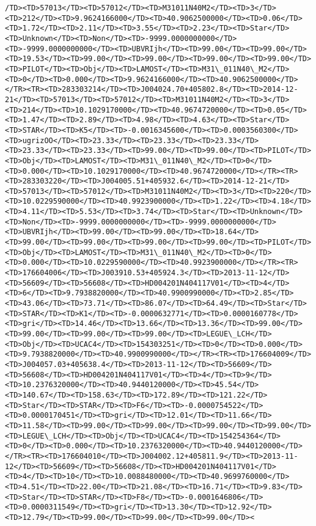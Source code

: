 \documentclass[11pt]{article}
\begin{document}
\begin{Verbatim}[commandchars=\\\{\}]
/TD><TD>57013</TD><TD>57012</TD><TD>M31011N40M2</TD><TD>3</TD><TD>212</TD><TD>9.9624166000</TD><TD>40.9062500000</TD><TD>0.06</TD><TD>1.72</TD><TD>2.11</TD><TD>3.55</TD><TD>2.23</TD><TD>Star</TD><TD>Unknown</TD><TD>Non</TD><TD>-9999.0000000000</TD><TD>-9999.0000000000</TD><TD>UBVRIjh</TD><TD>99.00</TD><TD>99.00</TD><TD>19.53</TD><TD>99.00</TD><TD>99.00</TD><TD>99.00</TD><TD>99.00</TD><TD>PILOT</TD><TD>Obj</TD><TD>LAMOST</TD><TD>M31\_011N40\_M2</TD><TD>0</TD><TD>0.000</TD><TD>9.9624166000</TD><TD>40.9062500000</TD></TR><TR><TD>283303214</TD><TD>J004024.70+405802.8</TD><TD>2014-12-21</TD><TD>57013</TD><TD>57012</TD><TD>M31011N40M2</TD><TD>3</TD><TD>214</TD><TD>10.1029170000</TD><TD>40.9674720000</TD><TD>0.05</TD><TD>1.47</TD><TD>2.89</TD><TD>4.98</TD><TD>4.63</TD><TD>Star</TD><TD>STAR</TD><TD>K5</TD><TD>-0.0016345600</TD><TD>0.0003560300</TD><TD>ugrizOO</TD><TD>23.33</TD><TD>23.33</TD><TD>23.33</TD><TD>23.33</TD><TD>23.33</TD><TD>99.00</TD><TD>99.00</TD><TD>PILOT</TD><TD>Obj</TD><TD>LAMOST</TD><TD>M31\_011N40\_M2</TD><TD>0</TD><TD>0.000</TD><TD>10.1029170000</TD><TD>40.9674720000</TD></TR><TR><TD>283303220</TD><TD>J004005.51+405932.6</TD><TD>2014-12-21</TD><TD>57013</TD><TD>57012</TD><TD>M31011N40M2</TD><TD>3</TD><TD>220</TD><TD>10.0229590000</TD><TD>40.9923900000</TD><TD>1.22</TD><TD>4.18</TD><TD>4.11</TD><TD>5.53</TD><TD>3.74</TD><TD>Star</TD><TD>Unknown</TD><TD>Non</TD><TD>-9999.0000000000</TD><TD>-9999.0000000000</TD><TD>UBVRIjh</TD><TD>99.00</TD><TD>99.00</TD><TD>18.64</TD><TD>99.00</TD><TD>99.00</TD><TD>99.00</TD><TD>99.00</TD><TD>PILOT</TD><TD>Obj</TD><TD>LAMOST</TD><TD>M31\_011N40\_M2</TD><TD>0</TD><TD>0.000</TD><TD>10.0229590000</TD><TD>40.9923900000</TD></TR><TR><TD>176604006</TD><TD>J003910.53+405924.3</TD><TD>2013-11-12</TD><TD>56609</TD><TD>56608</TD><TD>HD004201N404117V01</TD><TD>4</TD><TD>6</TD><TD>9.7938820000</TD><TD>40.9900990000</TD><TD>2.85</TD><TD>43.06</TD><TD>73.71</TD><TD>86.07</TD><TD>64.49</TD><TD>Star</TD><TD>STAR</TD><TD>K1</TD><TD>-0.0000632771</TD><TD>0.0000160778</TD><TD>gri</TD><TD>14.46</TD><TD>13.66</TD><TD>13.36</TD><TD>99.00</TD><TD>99.00</TD><TD>99.00</TD><TD>99.00</TD><TD>LEGUE\_LCH</TD><TD>Obj</TD><TD>UCAC4</TD><TD>154303251</TD><TD>0</TD><TD>0.000</TD><TD>9.7938820000</TD><TD>40.9900990000</TD></TR><TR><TD>176604009</TD><TD>J004057.03+405638.4</TD><TD>2013-11-12</TD><TD>56609</TD><TD>56608</TD><TD>HD004201N404117V01</TD><TD>4</TD><TD>9</TD><TD>10.2376320000</TD><TD>40.9440120000</TD><TD>45.54</TD><TD>140.67</TD><TD>158.63</TD><TD>172.89</TD><TD>121.22</TD><TD>Star</TD><TD>STAR</TD><TD>F6</TD><TD>-0.0000754522</TD><TD>0.0000170451</TD><TD>gri</TD><TD>12.01</TD><TD>11.66</TD><TD>11.58</TD><TD>99.00</TD><TD>99.00</TD><TD>99.00</TD><TD>99.00</TD><TD>LEGUE\_LCH</TD><TD>Obj</TD><TD>UCAC4</TD><TD>154254364</TD><TD>0</TD><TD>0.000</TD><TD>10.2376320000</TD><TD>40.9440120000</TD></TR><TR><TD>176604010</TD><TD>J004002.12+405811.9</TD><TD>2013-11-12</TD><TD>56609</TD><TD>56608</TD><TD>HD004201N404117V01</TD><TD>4</TD><TD>10</TD><TD>10.0088480000</TD><TD>40.9699760000</TD><TD>4.51</TD><TD>22.00</TD><TD>21.08</TD><TD>16.71</TD><TD>9.83</TD><TD>Star</TD><TD>STAR</TD><TD>F8</TD><TD>-0.0001646806</TD><TD>0.0000311549</TD><TD>gri</TD><TD>13.30</TD><TD>12.92</TD><TD>12.79</TD><TD>99.00</TD><TD>99.00</TD><TD>99.00</TD><
\end{Verbatim}
\end{document}
